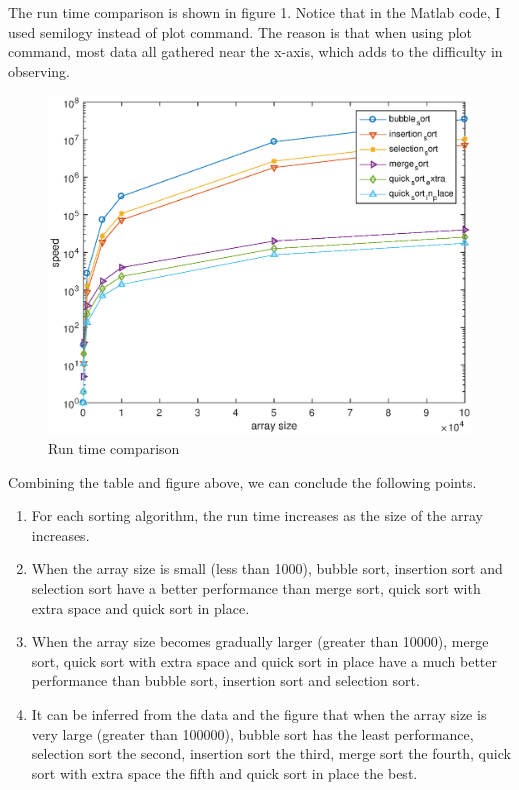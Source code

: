 \documentclass{article}
\begin{document}
\begin{spacing}{2.0}
The run time comparison is shown in figure 1. Notice that in the Matlab code, I used semilogy instead of plot command. The reason is that when using plot command, most data all gathered near the x-axis, which adds to the difficulty in observing.
\begin{figure}[h!]
\begin{center}
\includegraphics[scale=1]{run_time.eps}
\caption{Run time comparison}
\end{center}
\end{figure}

Combining the table and figure above, we can conclude the following points.
\begin{enumerate}
\item For each sorting algorithm, the run time increases as the size of the array increases.\\
\item When the array size is small (less than 1000), bubble sort, insertion sort and selection sort have a better performance than merge sort, quick sort with extra space and quick sort in place.\\
\item When the array size becomes gradually larger (greater than 10000), merge sort, quick sort with extra space and quick sort in place have a much better performance than bubble sort, insertion sort and selection sort.\\
\item It can be inferred from the data and the figure that when the array size is very large (greater than 100000), bubble sort has the least performance, selection sort the second, insertion sort the third, merge sort the fourth, quick sort with extra space the fifth and quick sort in place the best.\\
\end{enumerate}


\end{spacing}
\end{document}
